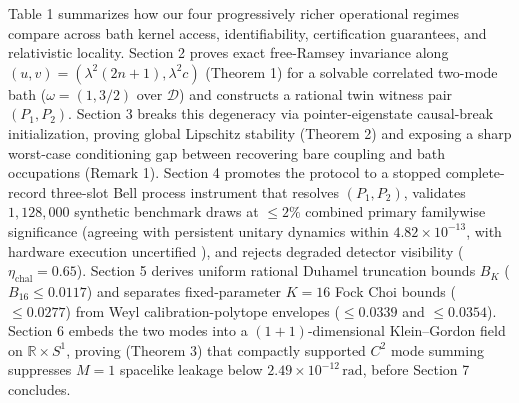 \documentclass[11pt,letterpaper]{article}
\theoremstyle{definition}
\begin{document}
Table 1 summarizes how our four progressively richer operational regimes
compare across bath kernel access, identifiability, certification
guarantees, and relativistic locality. Section 2 proves exact
free-Ramsey invariance along \((u, v) = (\lambda^2(2n+1), \lambda^2 c)\)
(Theorem 1) for a solvable correlated two-mode bath
(\(\omega = (1, 3/2)\) over \(\mathcal{D}\)) and constructs a rational
twin witness pair \((P_1, P_2)\). Section 3 breaks this degeneracy via
pointer-eigenstate causal-break initialization, proving global Lipschitz
stability (Theorem 2) and exposing a sharp worst-case conditioning gap
between recovering bare coupling and bath occupations (Remark 1).
Section 4 promotes the protocol to a stopped complete-record three-slot
Bell process instrument that resolves \((P_1, P_2)\), validates
\(1{,}128{,}000\) synthetic benchmark draws at \(\le 2\%\) combined
primary familywise significance (agreeing with persistent unitary
dynamics within \(4.82 \times 10^{-13}\), with hardware execution
uncertified \citep{masanes2019, renou2021}), and rejects degraded
detector visibility (\(\eta_{\mathrm{chal}} = 0.65\)). Section 5 derives
uniform rational Duhamel truncation bounds \(B_K\)
(\(B_{16} \le 0.0117\)) \citep{hornJohnson2012, mascherpa2017} and
separates fixed-parameter \(K=16\) Fock Choi bounds (\(\le 0.0277\))
from Weyl calibration-polytope envelopes (\(\le 0.0339\) and
\(\le 0.0354\)). Section 6 embeds the two modes into a
\((1+1)\)-dimensional Klein--Gordon field on \(\mathbb{R} \times S^1\),
proving (Theorem 3) that compactly supported \(C^2\) mode summing
suppresses \(M=1\) spacelike leakage below
\(2.49 \times 10^{-12}\,\mathrm{rad}\), before Section 7 concludes.
\end{document}
